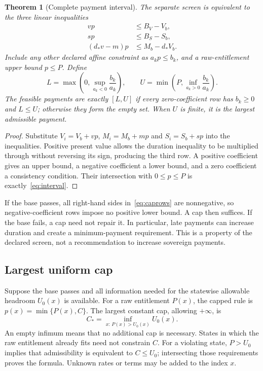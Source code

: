 \documentclass[11pt,a4paper]{article}
\newtheorem{theorem}{Theorem}[section]
\begin{document}
\begin{theorem}[Complete payment interval]\label{thm:cap}
The separate screen is equivalent to the three linear inequalities
\begin{align}\label{eq:caprows}
 vp&\leq B_V-V_b,\\
 sp&\leq B_S-S_b,\\
 (d_*v-m)p&\leq M_b-d_*V_b.
\end{align}
Include any other declared affine constraint as $a_kp\leq b_k$, and a raw-entitlement upper bound $p\leq P$. Define
\begin{equation}\label{eq:interval}
 L=\max\left(0,\sup_{a_k<0}\frac{b_k}{a_k}\right),\qquad
 U=\min\left(P,\inf_{a_k>0}\frac{b_k}{a_k}\right).
\end{equation}
The feasible payments are exactly $[L,U]$ if every zero-coefficient row has $b_k\geq0$ and $L\leq U$; otherwise they form the empty set. When $U$ is finite, it is the largest admissible payment.
\end{theorem}
\begin{proof}
Substitute $V_i=V_b+vp$, $M_i=M_b+mp$ and $S_i=S_b+sp$ into the inequalities. Positive present value allows the duration inequality to be multiplied through without reversing its sign, producing the third row. A positive coefficient gives an upper bound, a negative coefficient a lower bound, and a zero coefficient a consistency condition. Their intersection with $0\leq p\leq P$ is exactly~\eqref{eq:interval}.
\end{proof}

If the base passes, all right-hand sides in~\eqref{eq:caprows} are nonnegative, so negative-coefficient rows impose no positive lower bound. A cap then suffices. If the base fails, a cap need not repair it. In particular, late payments can increase duration and create a minimum-payment requirement. This is a property of the declared screen, not a recommendation to increase sovereign payments.

\subsection{Largest uniform cap}
Suppose the base passes and all information needed for the statewise allowable headroom $U_0(x)$ is available. For a raw entitlement $P(x)$, the capped rule is $p(x)=\min\{P(x),C\}$. The largest constant cap, allowing $+\infty$, is
\begin{equation}\label{eq:uniformcap}
 C_* = \inf_{x:\,P(x)>U_0(x)} U_0(x).
\end{equation}
An empty infimum means that no additional cap is necessary. States in which the raw entitlement already fits need not constrain $C$. For a violating state, $P>U_0$ implies that admissibility is equivalent to $C\leq U_0$; intersecting those requirements proves the formula. Unknown rates or terms may be added to the index $x$.
\end{document}
